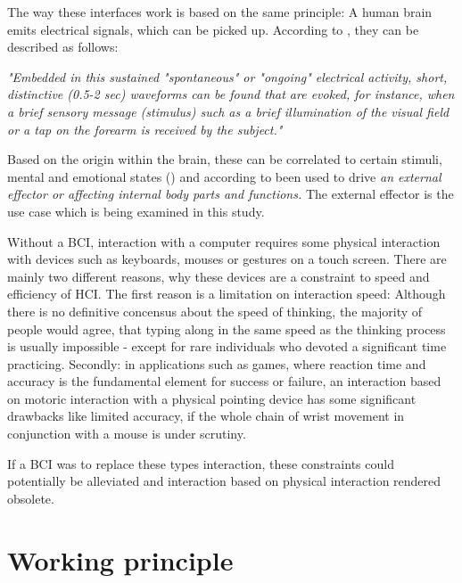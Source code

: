             The way these interfaces work is based on the same principle: A human brain emits electrical signals, which can be picked up.
            According to \cite{Vidal.1973}, they can be described as follows:

            \medskip
            \emph{"Embedded in this sustained "spontaneous" or "ongoing" electrical activity, short, distinctive (0.5-2 sec) waveforms can be found that are evoked, for instance, when a brief sensory message (stimulus) such as a brief illumination of the visual field or a tap on the forearm is received by the subject."}
            \medskip

            Based on the origin within the brain, these can be correlated to certain stimuli, mental and emotional states (\cite{JardimGoncalves.2018}) and according to \cite{Waldert.2016} been used to drive \emph{an external effector or affecting internal body parts and functions.} The external effector is the use case which is being examined in this study.

            Without a BCI, interaction with a computer requires some physical interaction with devices such as keyboards, mouses or gestures on a touch screen. There are mainly two different reasons, why these devices are a constraint to speed and efficiency of HCI. The first reason is a limitation on interaction speed: Although there is no definitive concensus about the speed of thinking, the majority of people would agree, that typing along in the same speed as the thinking process is usually impossible - except for rare individuals who devoted a significant time practicing. Secondly: in applications such as games, where reaction time and accuracy is the fundamental element for success or failure, an interaction based on motoric interaction with a physical pointing device has some significant drawbacks like limited accuracy, if the whole chain of wrist movement in conjunction with a mouse is under scrutiny. 

            If a BCI was to replace these types interaction, these constraints could potentially be alleviated and interaction based on physical interaction rendered obsolete. 

        \section{Working principle}            

